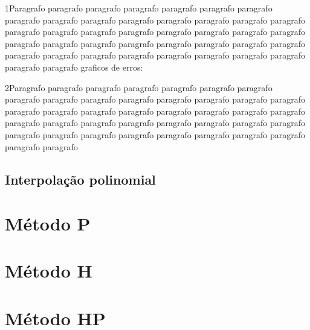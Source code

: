 1Paragrafo paragrafo paragrafo paragrafo paragrafo paragrafo paragrafo paragrafo paragrafo paragrafo paragrafo paragrafo paragrafo paragrafo paragrafo paragrafo paragrafo paragrafo paragrafo paragrafo paragrafo paragrafo paragrafo paragrafo paragrafo paragrafo paragrafo paragrafo paragrafo paragrafo paragrafo paragrafo paragrafo paragrafo paragrafo paragrafo paragrafo paragrafo paragrafo paragrafo paragrafo
graficos de erros:


2Paragrafo paragrafo paragrafo paragrafo paragrafo paragrafo paragrafo paragrafo paragrafo paragrafo paragrafo paragrafo paragrafo paragrafo paragrafo paragrafo paragrafo paragrafo paragrafo paragrafo paragrafo paragrafo paragrafo paragrafo paragrafo paragrafo paragrafo paragrafo paragrafo paragrafo paragrafo paragrafo paragrafo paragrafo paragrafo paragrafo paragrafo paragrafo paragrafo paragrafo paragrafo


\subsection{Interpolação polinomial}

\section{Método P}

\section{Método H}


\section{Método HP}

